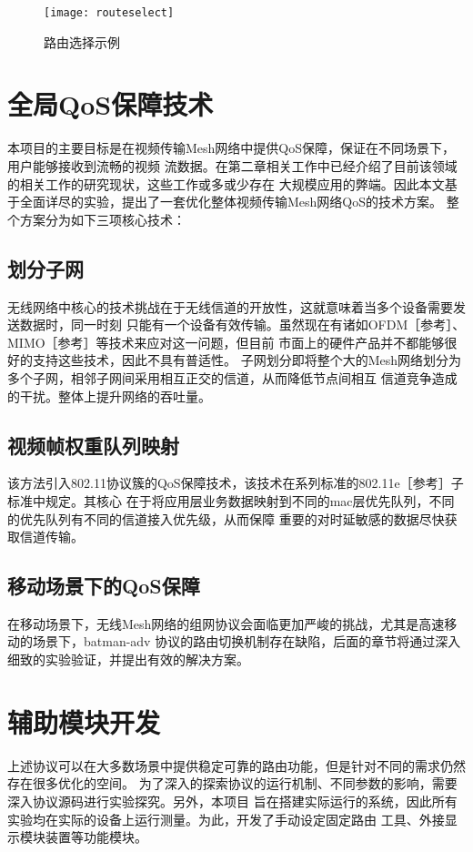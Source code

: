 \begin{figure}[H] %
  \centering
  \texttt{[image: routeselect]}
  \caption{路由选择示例}
  \label{fig:routeselect}
\end{figure}

\section{全局QoS保障技术}
本项目的主要目标是在视频传输Mesh网络中提供QoS保障，保证在不同场景下，用户能够接收到流畅的视频
流数据。在第二章相关工作中已经介绍了目前该领域的相关工作的研究现状，这些工作或多或少存在
大规模应用的弊端。因此本文基于全面详尽的实验，提出了一套优化整体视频传输Mesh网络QoS的技术方案。
整个方案分为如下三项核心技术：

\subsection{划分子网}
    无线网络中核心的技术挑战在于无线信道的开放性，这就意味着当多个设备需要发送数据时，同一时刻
只能有一个设备有效传输。虽然现在有诸如OFDM［参考］、MIMO［参考］等技术来应对这一问题，但目前
市面上的硬件产品并不都能够很好的支持这些技术，因此不具有普适性。
    子网划分即将整个大的Mesh网络划分为多个子网，相邻子网间采用相互正交的信道，从而降低节点间相互
信道竞争造成的干扰。整体上提升网络的吞吐量。

\subsection{视频帧权重队列映射}
    该方法引入802.11协议簇的QoS保障技术，该技术在系列标准的802.11e［参考］子标准中规定。其核心
在于将应用层业务数据映射到不同的mac层优先队列，不同的优先队列有不同的信道接入优先级，从而保障
重要的对时延敏感的数据尽快获取信道传输。

\subsection{移动场景下的QoS保障}
    在移动场景下，无线Mesh网络的组网协议会面临更加严峻的挑战，尤其是高速移动的场景下，batman-adv
协议的路由切换机制存在缺陷，后面的章节将通过深入细致的实验验证，并提出有效的解决方案。

\section{辅助模块开发}
上述协议可以在大多数场景中提供稳定可靠的路由功能，但是针对不同的需求仍然存在很多优化的空间。
为了深入的探索协议的运行机制、不同参数的影响，需要深入协议源码进行实验探究。另外，本项目
旨在搭建实际运行的系统，因此所有实验均在实际的设备上运行测量。为此，开发了手动设定固定路由
工具、外接显示模块装置等功能模块。

